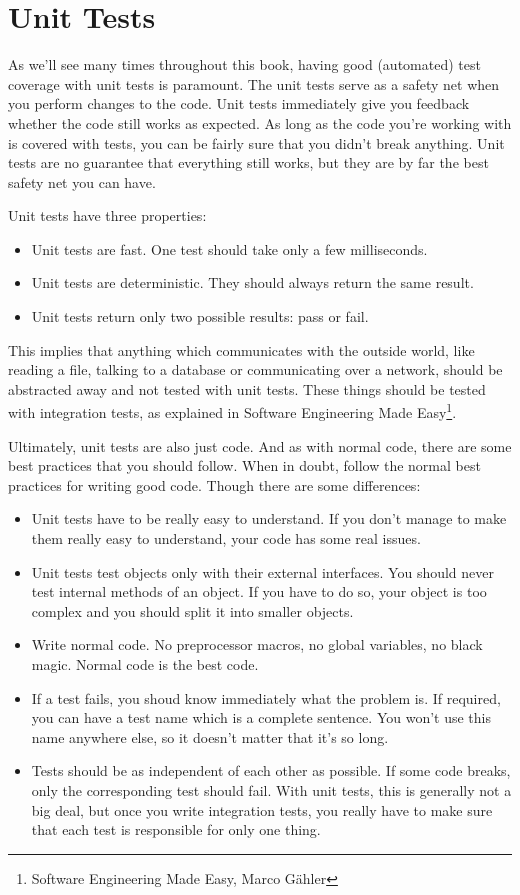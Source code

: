 
\section{Unit Tests}

As we'll see many times throughout this book, having good (automated) test coverage with unit tests is paramount. The unit tests serve as a safety net when you perform changes to the code. Unit tests immediately give you feedback whether the code still works as expected. As long as the code you're working with is covered with tests, you can be fairly sure that you didn't break anything. Unit tests are no guarantee that everything still works, but they are by far the best safety net you can have.

Unit tests have three properties:
\begin{itemize}
    \item Unit tests are fast. One test should take only a few milliseconds.
    \item Unit tests are deterministic. They should always return the same result.
    \item Unit tests return only two possible results: pass or fail.
\end{itemize}

This implies that anything which communicates with the outside world, like reading a file, talking to a database or communicating over a network, should be abstracted away and not tested with unit tests. These things should be tested with integration tests, as explained in Software Engineering Made Easy\footnote{Software Engineering Made Easy, Marco Gähler}.

Ultimately, unit tests are also just code. And as with normal code, there are some best practices that you should follow. When in doubt, follow the normal best practices for writing good code. Though there are some differences:
\begin{itemize}
    \item Unit tests have to be really easy to understand. If you don't manage to make them really easy to understand, your code has some real issues.
    \item Unit tests test objects only with their external interfaces. You should never test internal methods of an object. If you have to do so, your object is too complex and you should split it into smaller objects.
    \item Write normal code. No preprocessor macros, no global variables, no black magic. Normal code is the best code.
    \item If a test fails, you shoud know immediately what the problem is. If required, you can have a test name which is a complete sentence. You won't use this name anywhere else, so it doesn't matter that it's so long.
    \item Tests should be as independent of each other as possible. If some code breaks, only the corresponding test should fail. With unit tests, this is generally not a big deal, but once you write integration tests, you really have to make sure that each test is responsible for only one thing.
\end{itemize}

